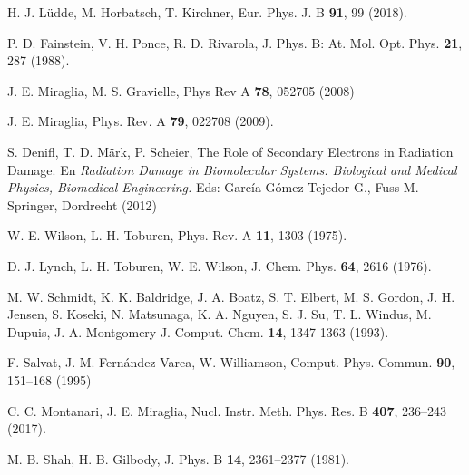 \begin{thebibliography}{9}
H. J. L\"udde, M. Horbatsch, T. Kirchner,
Eur. Phys. J. B \textbf{91}, 99 (2018).

P. D. Fainstein, V. H. Ponce, R. D. Rivarola,
J. Phys. B: At. Mol. Opt. Phys. \textbf{21}, 287 (1988).

J. E. Miraglia, M. S. Gravielle,
Phys Rev A \textbf{78}, 052705 (2008)

J. E. Miraglia, 
Phys. Rev. A \textbf{79}, 022708 (2009).

S. Denifl, T. D. Märk, P. Scheier,
The Role of Secondary Electrons in Radiation Damage. 
En \textit{Radiation Damage in Biomolecular Systems. Biological and Medical Physics, Biomedical Engineering.} 
Eds: García Gómez-Tejedor G., Fuss M. 
Springer, Dordrecht (2012) 

W. E. Wilson, L. H. Toburen,
Phys. Rev. A \textbf{11}, 1303 (1975).

D. J. Lynch, L. H. Toburen, W. E. Wilson,
J. Chem. Phys. \textbf{64}, 2616 (1976).

M. W. Schmidt, K. K. Baldridge, J. A. Boatz, S. T. Elbert, M. S. Gordon, 
J. H. Jensen, S. Koseki, N. Matsunaga, K. A. Nguyen, S. J. Su, T. L. Windus, 
M. Dupuis, J. A. Montgomery 
J. Comput. Chem. \textbf{14}, 1347-1363 (1993).

F. Salvat, J. M. Fern\'andez-Varea, W. Williamson,
Comput. Phys. Commun. \textbf{90}, 151--168 (1995)

C. C. Montanari, J. E. Miraglia,
Nucl. Instr. Meth. Phys. Res. B \textbf{407}, 236--243 (2017).


M. B. Shah, H. B. Gilbody,
J. Phys. B \textbf{14}, 2361--2377 (1981).


\end{thebibliography}
